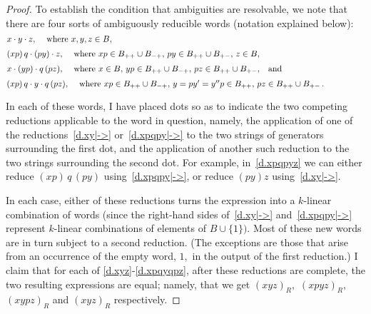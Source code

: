 \documentclass{amsart}
\begin{document}
\begin{proof}
To establish the condition that ambiguities are
resolvable, we note that there are four
sorts of ambiguously reducible words (notation explained below):
\begin{equation}\begin{minipage}[c]{35pc}\label{d.xyz}
$x\cdot y\cdot z,$ \quad where $x,y,z\in B,$
\end{minipage}\end{equation}
\begin{equation}\begin{minipage}[c]{35pc}\label{d.xpqpyz}
$(xp)\,q \cdot (py)\cdot z,$ \quad where
$xp\in B_{++}\cup B_{-+},$
$py\in B_{++}\cup B_{+-},$
$z\in B,$
\end{minipage}\end{equation}
\begin{equation}\begin{minipage}[c]{35pc}\label{d.xypqpz}
$x\cdot (yp) \cdot q\,(pz),$ \quad where
$x\in B,$
$yp\in B_{++}\cup B_{-+},$
$pz\in B_{++}\cup B_{+-},$\quad and
\end{minipage}\end{equation}
\begin{equation}\begin{minipage}[c]{35pc}\label{d.xpqyqpz}
$(xp)\,q \cdot y\cdot q\,(pz),$ \quad where
$xp\in B_{++}\cup B_{-+},$
$y=py'=y''p\in B_{++},$
$pz\in B_{++}\cup B_{+-}\,.$
\end{minipage}\end{equation}

In each of these words, I have placed dots so as
to indicate the two competing reductions applicable to the word in
question, namely, the application of one of the
reductions~\eqref{d.xy|->} or~\eqref{d.xpqpy|->}
to the two strings of generators surrounding
the first dot, and the application of another such reduction
to the two strings surrounding the second dot.
For example, in~\eqref{d.xpqpyz} we can either reduce
$(xp)\,q\,(py)$ using~\eqref{d.xpqpy|->}, or reduce
$(py)z$ using~\eqref{d.xy|->}.

In each case, either of these reductions turns the expression into
a $\!k\!$-linear combination of words (since the right-hand sides
of~\eqref{d.xy|->} and~\eqref{d.xpqpy|->} represent $\!k\!$-linear
combinations of elements of $B\cup\{1\}).$
Most of these new words are in turn subject to a second reduction.
(The exceptions are those that arise from an occurrence of
the empty word, $1,$ in the output of the first reduction.)
I claim that for each of \eqref{d.xyz}-\eqref{d.xpqyqpz},
after these reductions are complete,
the two resulting expressions are equal;
namely, that we get $(xyz)_R,$ $(xpyz)_R,$ $(xypz)_R$ and
$(xyz)_R$ respectively.


\end{proof}
\end{document}
